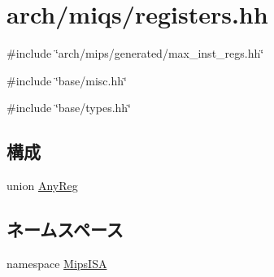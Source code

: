 \hypertarget{miqs_2registers_8hh}{
\section{arch/miqs/registers.hh}
\label{miqs_2registers_8hh}
}
{\ttfamily \#include \char`\"{}arch/mips/generated/max\_\-inst\_\-regs.hh\char`\"{}}\par
{\ttfamily \#include \char`\"{}base/misc.hh\char`\"{}}\par
{\ttfamily \#include \char`\"{}base/types.hh\char`\"{}}\par
\subsection*{構成}
\begin{DoxyCompactItemize}
\item 
union \hyperlink{unionMipsISA_1_1AnyReg}{AnyReg}
\end{DoxyCompactItemize}
\subsection*{ネームスペース}
\begin{DoxyCompactItemize}
\item 
namespace \hyperlink{namespaceMipsISA}{MipsISA}
\end{DoxyCompactItemize}
